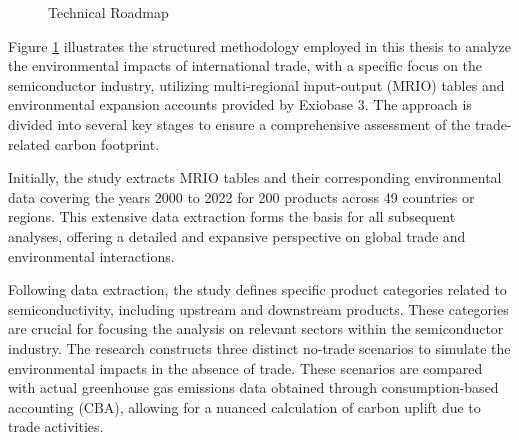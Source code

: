 \ifincludefigures
\begin{figure}
\centering
{}
 \caption{Technical Roadmap}\label{fig:tech roadmap}
\end{figure}
\fi                                                                                                                                                                                     
Figure \ref{fig:tech roadmap} illustrates the structured methodology employed in this thesis to analyze the environmental impacts of international trade, with a specific focus on the semiconductor industry, utilizing multi-regional input-output (MRIO) tables and environmental expansion accounts provided by Exiobase 3. The approach is divided into several key stages to ensure a comprehensive assessment of the trade-related carbon footprint.

Initially, the study extracts MRIO tables and their corresponding environmental data covering the years 2000 to 2022 for 200 products across 49 countries or regions. This extensive data extraction forms the basis for all subsequent analyses, offering a detailed and expansive perspective on global trade and environmental interactions.

Following data extraction, the study defines specific product categories related to semiconductivity, including upstream and downstream products. These categories are crucial for focusing the analysis on relevant sectors within the semiconductor industry. The research constructs three distinct no-trade scenarios to simulate the environmental impacts in the absence of trade. These scenarios are compared with actual greenhouse gas emissions data obtained through consumption-based accounting (CBA), allowing for a nuanced calculation of carbon uplift due to trade activities.

